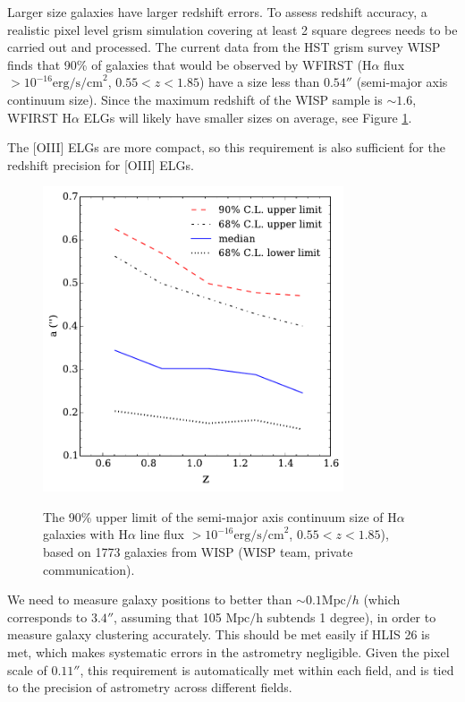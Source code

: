  Larger size galaxies have larger redshift errors. To assess redshift accuracy,
 a realistic pixel level grism simulation covering at least 2 square degrees
 needs to be carried out and processed. The current data from the HST grism
 survey WISP finds that 90\% of galaxies that would be observed by WFIRST
 (H$\alpha$ flux $> 10^{-16} \mathrm{erg/s/cm}^2$, $0.55 < z < 1.85$) have a
 size less than $0.54''$ (semi-major axis continuum size). Since the maximum
 redshift of the WISP sample is $\sim1.6$, WFIRST H$\alpha$ ELGs will likely
 have smaller sizes on average, see Figure \ref{fig:size_zbin}.

 The [OIII] ELGs are more compact, so this requirement is also sufficient for
 the redshift precision for [OIII] ELGs.

\begin{figure}
\includegraphics[width = 3.5in]{Plots/size_zbin.pdf}
\label{fig:size_zbin}
\caption{The 90\% upper limit of the semi-major axis
continuum size of H$\alpha$ galaxies with H$\alpha$ line flux $>10^{-16}
\mathrm{erg/s/cm}^2$, $0.55 < z < 1.85$), based on 1773 galaxies from WISP (WISP
team, private communication).} \end{figure}


 We need to measure galaxy positions to better than $\sim0.1 \mathrm{Mpc}/h$ (which corresponds to $3.4''$, assuming that 105 $\mathrm{Mpc/h}$ subtends 1 degree), in order to measure galaxy clustering accurately. This should be met easily if HLIS 26 is met, which makes systematic errors in the astrometry negligible. Given the pixel scale of $0.11''$, this requirement is automatically met within each field, and is tied to the precision of astrometry across different fields.

